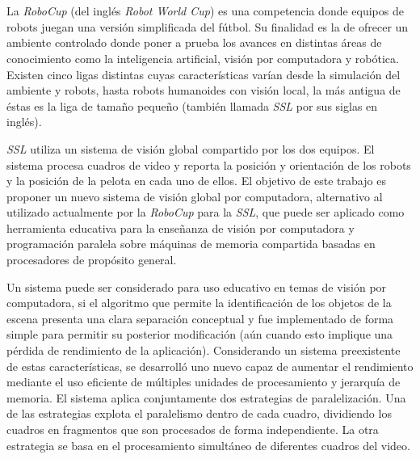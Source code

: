 \ \\
\ \\
\label{pagresum}
\\
\ \\
\ \\

\ \\

\ \\

La \emph{RoboCup} (del inglés \emph{Robot World Cup}) es una competencia donde
equipos de robots juegan una versión simplificada del fútbol. Su finalidad es
la de ofrecer un ambiente controlado donde poner a prueba los avances en
distintas áreas de conocimiento como la inteligencia artificial, visión por
computadora y robótica. Existen cinco ligas distintas cuyas características
varían desde la simulación del ambiente y robots, hasta robots humanoides con
visión local, la más antigua de éstas es la liga de tamaño pequeño (también
llamada \emph{SSL} por sus siglas en inglés).

\emph{SSL} utiliza un sistema de visión global compartido por los dos equipos.
El sistema procesa cuadros de video y reporta la posición y orientación de los
robots y la posición de la pelota en cada uno de ellos. El objetivo de este
trabajo es proponer un nuevo sistema de visión global por computadora,
alternativo al utilizado actualmente por la \emph{RoboCup} para la \emph{SSL},
que puede ser aplicado como herramienta educativa para la enseñanza de visión
por computadora y programación paralela sobre máquinas de memoria compartida
basadas en procesadores de propósito general.

Un sistema puede ser considerado para uso educativo en temas de visión por
computadora, si el algoritmo que permite la identificación de los objetos de la
escena presenta una clara separación conceptual y fue implementado de forma
simple para permitir su posterior modificación (aún cuando esto implique una
pérdida de rendimiento de la aplicación). Considerando un sistema preexistente
de estas características, se desarrolló uno nuevo capaz de aumentar el
rendimiento mediante el uso eficiente de múltiples unidades de procesamiento y
jerarquía de memoria. El sistema aplica conjuntamente dos estrategias de
paralelización. Una de las estrategias explota el paralelismo dentro de cada
cuadro, dividiendo los cuadros en fragmentos que son procesados de forma
independiente. La otra estrategia se basa en el procesamiento simultáneo de
diferentes cuadros del video.

